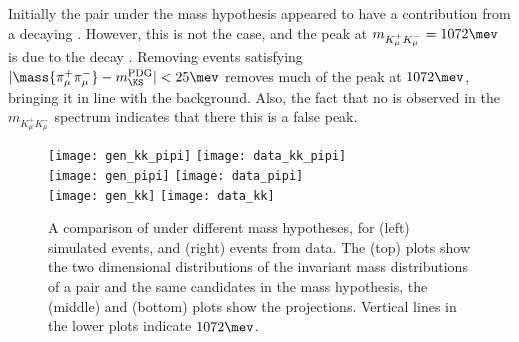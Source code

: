 Initially the \mumu pair under the \kk mass hypothesis appeared to have a contribution from a
decaying \xtsvty.
However, this is not the case, and the peak at $m_{K^+_\mu K^-_\mu}=1072\mev$ is due to the decay
\decay{\KS}{\pipi}.
Removing events satisfying $|\mass{\pi_\mu^+\pi_\mu^-}-m_{\KS}^\mathrm{PDG}|<25\mev$ removes much
of the peak at $1072\mev$, bringing it in line with the background.
Also, the fact that no \decay{\phi}{\kk} is observed in the $m_{K^+_\mu K^-_\mu}$ spectrum
indicates that there this is a false peak.


\begin{figure}
  \begin{center}
    \texttt{[image: gen\_kk\_pipi]}
    \texttt{[image: data\_kk\_pipi]}\\
    \texttt{[image: gen\_pipi]}
    \texttt{[image: data\_pipi]}\\
    \texttt{[image: gen\_kk]}
    \texttt{[image: data\_kk]}
    \caption[Analysis of the \decay{\KS}{\pipi} background under the \kk mass hypothesis]
    {
      A comparison of \decay{\KS}{\pi\pi} under different mass hypotheses, for
      (left) simulated events, and
      (right) events from data.
      The (top) plots show the two dimensional distributions of the invariant mass distributions of
      a \pipi pair and the same candidates in the \kk mass hypothesis, the (middle) and (bottom)
      plots show the projections.
      Vertical lines in the lower plots indicate $1072\mev$.
    }
    \label{fig:db:x1070:2d}
  \end{center}
\end{figure}


